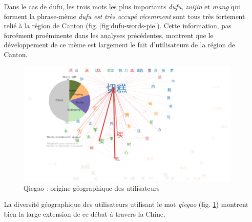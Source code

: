 Dans le cas de dufu, les trois mots les plus importants \textit{dufu}, \textit{zuijin} et \textit{mang} qui forment la phrase-mème \textit{dufu est très occupé récemment} sont tous très fortement relié \`a la région de Canton (fig. \ref{fig:dufu-words-pie}). Cette information, pas forcément proéminente dans les analyses précédentes, montrent que le développement de ce mème est largement le fait d{\textquoteright}utilisateurs de la région de Canton.

\begin{figure}[h!]
    \centering
    \includegraphics[scale=0.3]{figures/chap4/words_pie_qiegao_Nov_19_2012_Dec_16_2012}
    \caption{
      Qiegao : origine géographique des utilisateurs
    }
    \label{fig:qiegao-words-pie}
\end{figure}

La diversité géographique des utilisateurs utilisant le mot \textit{qiegao} (fig. \ref{fig:qiegao-words-pie}) montrent bien la large extension de ce débat à travers la Chine.